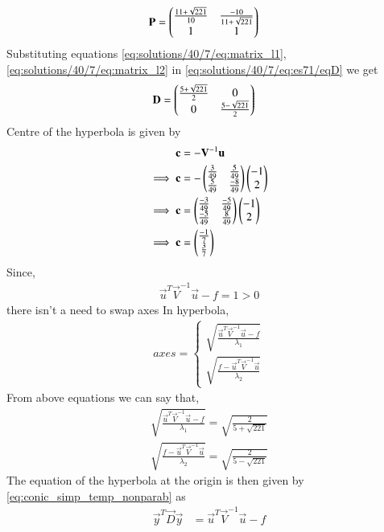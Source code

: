 \begin{enumerate}
\begin{align}
    \mathbf{P}&=\begin{pmatrix}\frac{11+\sqrt{221}}{10} & \frac{-10}{11+\sqrt{221}} \\1 & 1\end{pmatrix}\label{eq:solutions/40/7/eq:es71/eqP}
\end{align}
Substituting equations \ref{eq:solutions/40/7/eq:matrix_l1}, \ref{eq:solutions/40/7/eq:matrix_l2} in \ref{eq:solutions/40/7/eq:es71/eqD} we get
\begin{align}
       \mathbf{D}&=\begin{pmatrix}\frac{5+\sqrt{221}}{2} & 0\\0 & \frac{5-\sqrt{221}}{2}\end{pmatrix}\label{eq:solutions/40/7/eq:es71/eqDD}
\end{align}
Centre of the hyperbola is given by 
\begin{align}
    \mathbf{c}&=-\mathbf{V}^{-1}\mathbf{u}\\
    \implies\mathbf{c}&=-\begin{pmatrix}\frac{3}{49}&\frac{5}{49}\\\frac{5}{49}&\frac{-8}{49}\end{pmatrix}\begin{pmatrix}-1 \\ 2\end{pmatrix}\\
    \implies\mathbf{c}&=\begin{pmatrix}\frac{-3}{49}&\frac{-5}{49}\\\frac{-5}{49}&\frac{8}{49}\end{pmatrix}\begin{pmatrix}-1 \\ 2\end{pmatrix}\\
    \implies\mathbf{c}&=\begin{pmatrix}\frac{-1}{7}\\\frac{3}{7}\end{pmatrix}
\end{align}
Since,
\begin{align}
    \vec{u}^T\vec{V}^{-1}\vec{u}-f = 1 > 0\label{eq:solutions/40/7/eq:es71/cond}
\end{align} 
there isn't a need to swap axes
In hyperbola,
\begin{align}
axes=
\begin{cases}
\sqrt{\frac{\vec{u}^T\vec{V}^{-1}\vec{u}-f}{\lambda_1}}\\ \sqrt{\frac{f-\vec{u}^T\vec{V}^{-1}\vec{u}}{\lambda_2}}
\end{cases}
\end{align}
From above equations we can say that,
\begin{align}
\sqrt{\frac{\vec{u}^T\vec{V}^{-1}\vec{u}-f}{\lambda_1}}=\sqrt{ \frac{2}{5+\sqrt{221}}}\\
\sqrt{\frac{f-\vec{u}^T\vec{V}^{-1}\vec{u}}{\lambda_2}}=\sqrt{ \frac{2}{5-\sqrt{221}}}
\end{align}
The equation of the hyperbola at the origin is then given by \eqref{eq:conic_simp_temp_nonparab} as
\begin{align}
    \vec{y}^T\vec{D}\vec{y}&=\vec{u}^T\vec{V}^{-1}\vec{u}-f\label{eq:solutions/40/7/eq:es71/fi}

\end{align}
\end{enumerate}
